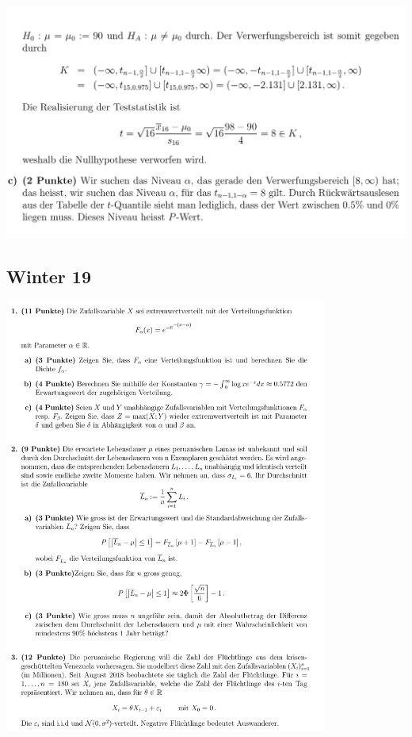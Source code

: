\includegraphics[width=0.8\linewidth]{old_exams_prtsrc/cher_infk_wi19_ml-5.png}\\


\subsection{Winter 19}
\includegraphics[height=143mm]{old_exams_prtsrc/aufgaben/cher_infk_wi19_pr-3.png}\newline
